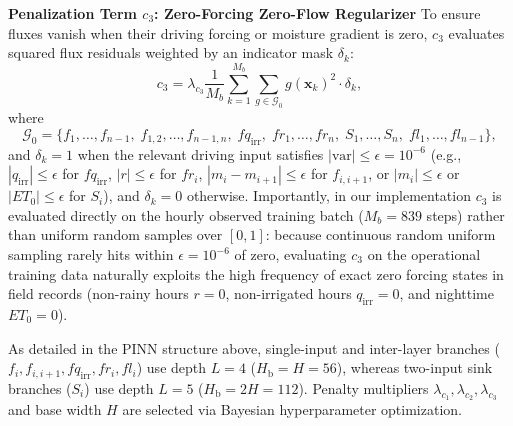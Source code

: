 \documentclass[pdflatex,sn-nature]{sn-jnl}%
\theoremstyle{thmstyleone}%
\theoremstyle{thmstyletwo}%
\theoremstyle{thmstylethree}%
\begin{document}
\textbf{Penalization Term \( c_3 \): Zero-Forcing Zero-Flow Regularizer}
To ensure fluxes vanish when their driving forcing or moisture gradient is zero, \( c_3 \) evaluates squared flux residuals weighted by an indicator mask \( \delta_k \):
\[
c_3 = \lambda_{c_3} \frac{1}{M_b} \sum_{k=1}^{M_b} \sum_{g \in \mathcal{G}_0} g(\mathbf{x}_k)^2 \cdot \delta_k,
\]
where
\[
\mathcal{G}_0 = \bigl\{ f_1, \dots, f_{n-1},\; f_{1,2}, \dots, f_{n-1,n},\; fq_{\mathrm{irr}},\; fr_1, \dots, fr_n,\; S_1, \dots, S_n,\; fl_1, \dots, fl_{n-1} \bigr\},
\]
and \( \delta_k = 1 \) when the relevant driving input satisfies \( |\text{var}| \le \epsilon = 10^{-6} \) (e.g., \( |q_{\mathrm{irr}}| \le \epsilon \) for \( fq_{\mathrm{irr}} \), \( |r| \le \epsilon \) for \( fr_i \), \( |m_i - m_{i+1}| \le \epsilon \) for \( f_{i,i+1} \), or \( |m_i| \le \epsilon \) or \( |ET_0| \le \epsilon \) for \( S_i \)), and \( \delta_k = 0 \) otherwise. Importantly, in our implementation \( c_3 \) is evaluated directly on the hourly observed training batch (\( M_b = 839 \) steps) rather than uniform random samples over \( [0,1] \): because continuous random uniform sampling rarely hits within \( \epsilon = 10^{-6} \) of zero, evaluating \( c_3 \) on the operational training data naturally exploits the high frequency of exact zero forcing states in field records (non-rainy hours \( r=0 \), non-irrigated hours \( q_{\mathrm{irr}}=0 \), and nighttime \( ET_0=0 \)).

As detailed in the PINN structure above, single-input and inter-layer branches (\( f_i, f_{i,i+1}, fq_{\mathrm{irr}}, fr_i, fl_i \)) use depth \( L=4 \) (\( H_{\mathrm{b}}=H=56 \)), whereas two-input sink branches (\( S_i \)) use depth \( L=5 \) (\( H_{\mathrm{b}}=2H=112 \)). Penalty multipliers \( \lambda_{c_1}, \lambda_{c_2}, \lambda_{c_3} \) and base width \( H \) are selected via Bayesian hyperparameter optimization.
\end{document}
